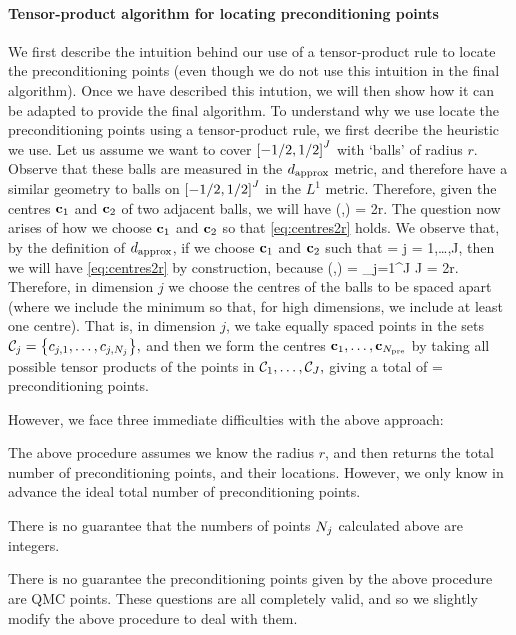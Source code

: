 \paragraph{Tensor-product algorithm for locating preconditioning points} We first describe the intuition behind our use of a tensor-product rule to locate the preconditioning points (even though we do not use this intuition in the final algorithm). Once we have described this intution, we will then show how it can be adapted to provide the final algorithm. To understand why we use locate the preconditioning points using a tensor-product rule, we first decribe the heuristic we use. Let us assume we want to cover $\cube{J}$ with `balls' of radius $r$. Observe that these balls are measured in the $d_{\mathrm{approx}}$ metric, and therefore have a similar geometry to balls on $\cube{J}$ in the $L^1$ metric. Therefore, given the centres $\mathbf{c}_{1}$ and $\mathbf{c}_{2}$ of two adjacent balls, we will have
\beq\label{eq:centres2r}
\dapprox(\bcone,\bct) = 2r.
\eeq
The question now arises of how we choose $\mathbf{c}_{1}$ and $\mathbf{c}_{2}$ so that \cref{eq:centres2r} holds. We observe that, by the definition of $d_{\mathrm{approx}}$, if we choose $\mathbf{c}_{1}$ and $\mathbf{c}_{2}$ such that
\beqs
\sqrt{\lambdaj} =  \tforall j = 1,\ldots,J,
\eeqs
then we will have \cref{eq:centres2r} by construction, because
\beqs
\dapprox(\bcone,\bct) = \sum_{j=1}^J J = 2r.
\eeqs
Therefore, in dimension $j$ we choose the centres of the balls to be spaced
\beqs
\min{}
\eeqs
apart (where we include the minimum so that, for high dimensions, we include at least one centre). That is, in dimension $j$, we take
\beq\label{eq:Nj}
\Nj \de \max{}
\eeq
equally spaced points in the sets $\centresj = \set{c_{j,1},\ldots,c_{j,\Nj}},$ and then we form the centres $\mathbf{c}_{1},\ldots,\mathbf{c}_{N_{\mathrm{pre}}}$ by taking all possible tensor products of the points in $\mathcal C_{1},\ldots,\mathcal C_{J},$ giving a total of
\beq\label{eq:Npre}
\Npre = \No \times \cdots \times \NJ
\eeq
preconditioning points.

However, we face three immediate difficulties with  the above approach:
\ben
\item The above procedure assumes we know the radius $r$, and then returns the total number of preconditioning points, and their locations. However, we only know in advance the ideal total number of preconditioning points.
\item There is no guarantee that the numbers of points $N_{j}$ calculated above are integers.
  \item There is no guarantee the preconditioning points given by the above procedure are QMC points.
    \een
    These questions are all completely valid, and so we slightly modify the above procedure to deal with them.

